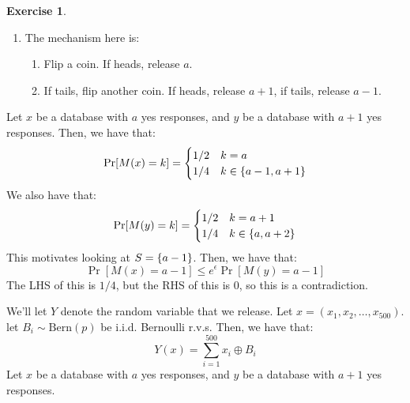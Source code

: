 \documentclass{article}
\theoremstyle{definition}
\newtheorem{exercise}{Exercise}[section]
\begin{document}
\begin{itemize}
\begin{exercise}
\begin{enumerate}
Let $x$ and $y$ be as before.
Then:
\begin{align*}
\Pr[M(x)\in\Bqty{a}]\not\leq e^\epsilon\Pr[M(y)\in\Bqty{a}]
\end{align*}
The LHS of this $1/2$, but the RHS of this is 0.
\item The mechanism here is:
\begin{enumerate}
\item Flip a coin. If heads, release $a$.
\item If tails, flip another coin. If heads, release $a+1$, if tails, release $a-1$.
\end{enumerate}
\end{enumerate}
Let $x$ be a database with $a$ yes responses, and $y$ be a database with $a+1$ yes responses.
Then, we have that:
\begin{equation}
\Pr[M(x) = k] = \begin{cases}
1/2 & k = a \\
1/4 & k \in\Bqty{a-1,a+1}
\end{cases}
\end{equation}
We also have that:
\begin{equation}
\Pr[M(y) = k] = \begin{cases}
1/2 & k = a+1 \\
1/4 & k \in\Bqty{a,a+2}
\end{cases}
\end{equation}
This motivates looking at $S = \Bqty{a-1}$.
Then, we have that:
\begin{equation}
\Pr[M(x) = a-1] \leq e^\epsilon\Pr[M(y) = a-1]
\end{equation}
The LHS of this is $1/4$, but the RHS of this is $0$, so this is a contradiction.
\item 
We'll let $Y$ denote the random variable that we release.
Let $x = (x_1,x_2,\dots,x_{500})$.
let $B_i\sim\text{Bern}(p)$ be i.i.d. Bernoulli r.v.s.
Then, we have that:
\begin{equation}
Y(x) = \sum_{i = 1}^{500} x_i \oplus B_i
\end{equation}
Let $x$ be a database with $a$ yes responses, and $y$ be a database with $a+1$ yes responses.


\end{exercise}
\end{itemize}
\end{document}
